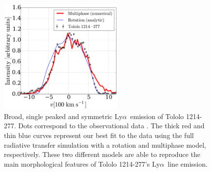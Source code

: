 \documentclass[a4,useAMS,usenatbib,usegraphicx]{mn2e}
\newcommand{\tol}{Tololo 1214-277}
\newcommand{\lya}{Ly$\alpha$}
\begin{document}
\begin{figure}
\begin{center}
\includegraphics[width=0.55\textwidth]{CLARA-TOL-main.pdf}
\caption{Broad, single peaked and symmetric \lya\ emission of \tol.
  Dots correspond to the observational data \citep{mashesse03}. 
The thick red and thin blue curves represent our best fit
to the data using the full radiative transfer simulation with a
rotation and multiphase model, respectively. 
These two different models are able to reproduce the main morphological
features of \tol's \lya\ line emission.}
\end{center}
\end{figure}
\end{document}

